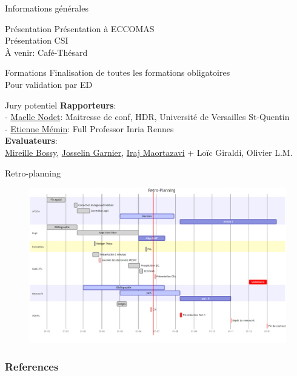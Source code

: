 \documentclass[aspectratio=169]{beamer} %
\begin{document}
\begin{frame}{Informations générales}
    \small
    \begin{block}{Présentation}
        Présentation à ECCOMAS \\
        Présentation CSI \\
        À venir: Café-Thésard
    \end{block}

    \begin{block}{Formations}
        Finalisation de toutes les formations obligatoires \\
        Pour validation par ED
    \end{block}

    \begin{block}{Jury potentiel}
        \textbf{Rapporteurs}:\\
        - \href{https://scholar.google.fr/citations?user=iM6Mv5MAAAAJ&hl=fr}{Maelle Nodet}: Maitresse de conf, HDR, Université de Versailles St-Quentin \\
        - \href{https://www.irisa.fr/prive/memin/resume-3C.html}{Etienne Mémin}: Full Professor Inria Rennes\\
        \textbf{Evaluateurs}: \\
        \href{https://www-sop.inria.fr/members/Mireille.Bossy}{Mireille Bossy}, \href{https://josselin-garnier.org/}{Josselin Garnier}, \href{https://scholar.google.com/citations?user=DokRauAAAAAJ&hl=fr}{Iraj Maortazavi} + Loïc Giraldi, Olivier L.M.
    \end{block}
\end{frame}

\begin{frame}{Retro-planning}
    \begin{figure}
        \includegraphics[width=\textwidth]{retro_planning.png}
    \end{figure}
\end{frame}

\begin{frame}
    \frametitle{References}
    \printbibliography %
\end{frame}

\end{document}
